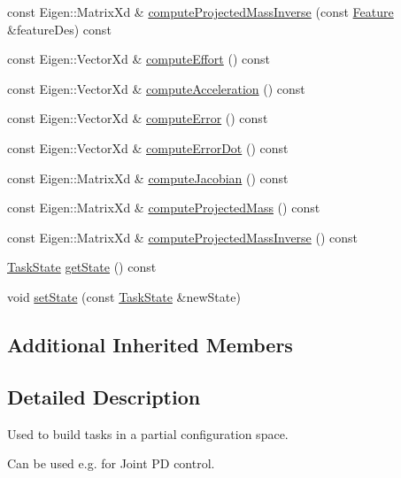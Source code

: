 \begin{DoxyCompactItemize}
\item 
const Eigen\+::\+Matrix\+Xd \& \hyperlink{classocra_1_1PartialStateFeature_a5013c1dc81d1be284a7a5ac3c2229307}{compute\+Projected\+Mass\+Inverse} (const \hyperlink{classocra_1_1Feature}{Feature} \&feature\+Des) const 
\item 
const Eigen\+::\+Vector\+Xd \& \hyperlink{classocra_1_1PartialStateFeature_a3446e01f00d810bff8d1ca741bd79e28}{compute\+Effort} () const 
\item 
const Eigen\+::\+Vector\+Xd \& \hyperlink{classocra_1_1PartialStateFeature_a8a15724f1c45314829c0b35b236a3068}{compute\+Acceleration} () const 
\item 
const Eigen\+::\+Vector\+Xd \& \hyperlink{classocra_1_1PartialStateFeature_a9fa86c54ec65414925d174fa333bbcf6}{compute\+Error} () const 
\item 
const Eigen\+::\+Vector\+Xd \& \hyperlink{classocra_1_1PartialStateFeature_afcf8923aea5cf17a4df065a1e39b3f26}{compute\+Error\+Dot} () const 
\item 
const Eigen\+::\+Matrix\+Xd \& \hyperlink{classocra_1_1PartialStateFeature_a93959f392ea7a6756b4cce337e829b07}{compute\+Jacobian} () const 
\item 
const Eigen\+::\+Matrix\+Xd \& \hyperlink{classocra_1_1PartialStateFeature_aa3a4e40857d67040fec7e95f4e8f0569}{compute\+Projected\+Mass} () const 
\item 
const Eigen\+::\+Matrix\+Xd \& \hyperlink{classocra_1_1PartialStateFeature_a85770eecd36b9a843705eed07085aa2a}{compute\+Projected\+Mass\+Inverse} () const 
\item 
\hyperlink{classocra_1_1TaskState}{Task\+State} \hyperlink{classocra_1_1PartialStateFeature_abb93055952187264bed4a37a80552b72}{get\+State} () const 
\item 
void \hyperlink{classocra_1_1PartialStateFeature_a89e830a1d3bea028431c4ae0844a6d95}{set\+State} (const \hyperlink{classocra_1_1TaskState}{Task\+State} \&new\+State)
\end{DoxyCompactItemize}
\subsection*{Additional Inherited Members}


\subsection{Detailed Description}
Used to build tasks in a partial configuration space. 

Can be used e.\+g. for Joint PD control. 

